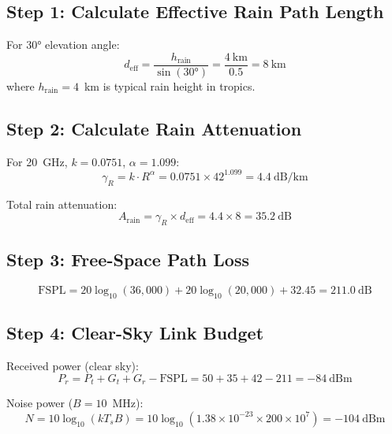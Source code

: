 \subsection*{Step 1: Calculate Effective Rain Path Length}

For $30°$ elevation angle:
\begin{equation}
d_{\text{eff}} = \frac{h_{\text{rain}}}{\sin(30°)} = \frac{4~\text{km}}{0.5} = 8~\text{km}
\end{equation}
where $h_{\text{rain}} = 4$~km is typical rain height in tropics.

\subsection*{Step 2: Calculate Rain Attenuation}

For 20~GHz, $k = 0.0751$, $\alpha = 1.099$:
\begin{equation}
\gamma_R = k \cdot R^\alpha = 0.0751 \times 42^{1.099} = 4.4~\text{dB/km}
\end{equation}

Total rain attenuation:
\begin{equation}
A_{\text{rain}} = \gamma_R \times d_{\text{eff}} = 4.4 \times 8 = 35.2~\text{dB}
\end{equation}

\subsection*{Step 3: Free-Space Path Loss}

\begin{equation}
\text{FSPL} = 20\log_{10}(36{,}000) + 20\log_{10}(20{,}000) + 32.45 = 211.0~\text{dB}
\end{equation}

\subsection*{Step 4: Clear-Sky Link Budget}

Received power (clear sky):
\begin{equation}
P_r = P_t + G_t + G_r - \text{FSPL} = 50 + 35 + 42 - 211 = -84~\text{dBm}
\end{equation}

Noise power ($B = 10$~MHz):
\begin{equation}
N = 10\log_{10}(kT_sB) = 10\log_{10}(1.38 \times 10^{-23} \times 200 \times 10^7) = -104~\text{dBm}
\end{equation}

